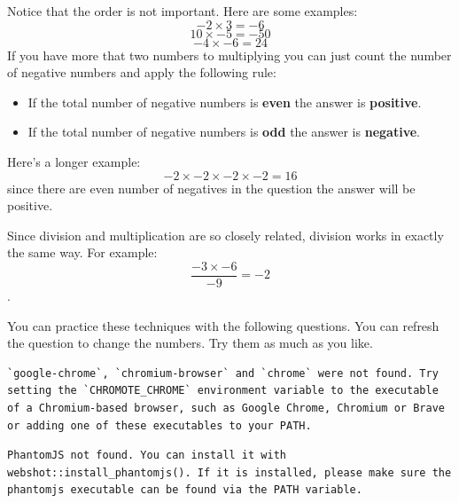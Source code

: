 \documentclass[
  a4paper,
]{scrbook}
\providecommand{\tightlist}{%
  \setlength{\itemsep}{0pt}\setlength{\parskip}{0pt}}
\begin{document}
Notice that the order is not important. Here are some examples: \[
-2 \times 3 = -6
\] \[
10 \times -5 = -50 
\] \[
-4 \times -6 = 24 
\] If you have more that two numbers to multiplying you can just count
the number of negative numbers and apply the following rule:

\begin{tcolorbox}[enhanced jigsaw, arc=.35mm, bottomrule=.15mm, bottomtitle=1mm, breakable, colback=white, colbacktitle=quarto-callout-note-color!10!white, colframe=quarto-callout-note-color-frame, coltitle=black, left=2mm, leftrule=.75mm, opacityback=0, opacitybacktitle=0.6, rightrule=.15mm, title=\textcolor{quarto-callout-note-color}{\faInfo}\hspace{0.5em}{Note}, titlerule=0mm, toprule=.15mm, toptitle=1mm]

\begin{itemize}
\tightlist
\item
  If the total number of negative numbers is \textbf{even} the answer is
  \textbf{positive}.
\item
  If the total number of negative numbers is \textbf{odd} the answer is
  \textbf{negative}.
\end{itemize}

\end{tcolorbox}

Here's a longer example: \[
-2 \times -2 \times -2 \times -2 = 16 
\] since there are even number of negatives in the question the answer
will be positive.

Since division and multiplication are so closely related, division works
in exactly the same way. For example: \[
\frac{-3 \times -6}{-9} = -2 
\].

You can practice these techniques with the following questions. You can
refresh the question to change the numbers. Try them as much as you
like.

\begin{verbatim}
`google-chrome`, `chromium-browser` and `chrome` were not found. Try setting the `CHROMOTE_CHROME` environment variable to the executable of a Chromium-based browser, such as Google Chrome, Chromium or Brave or adding one of these executables to your PATH.
\end{verbatim}

\begin{verbatim}
PhantomJS not found. You can install it with webshot::install_phantomjs(). If it is installed, please make sure the phantomjs executable can be found via the PATH variable.
\end{verbatim}
\end{document}
